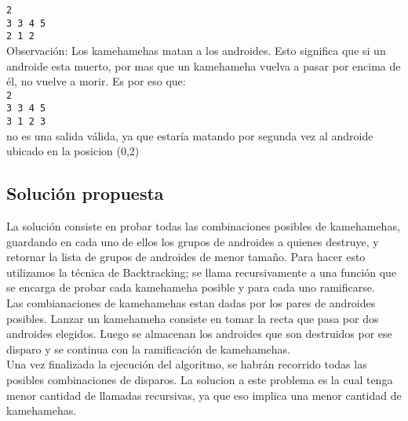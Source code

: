         \texttt{2} \\
        \texttt{3 3 4 5} \\
        \texttt{2 1 2} \\

        Observación: Los kamehamehas matan a los androides. Esto significa que si un androide esta muerto, por mas que un kamehameha vuelva a pasar por encima de él, no vuelve a morir. Es por eso que: \\

        \texttt{2} \\
        \texttt{3 3 4 5} \\
        \texttt{3 1 2 3} \\

        no es una salida válida, ya que estaría matando por segunda vez al androide ubicado en la posicion (0,2) \\
        

    \subsection{Solución propuesta}

    La solución consiste en probar todas las combinaciones posibles de kamehamehas, guardando en cada uno de ellos los grupos de androides a quienes destruye, y retornar la lista de grupos de androides de menor tamaño. Para hacer esto utilizamos la técnica de Backtracking; se llama recursivamente a una función que se encarga de probar cada kamehameha posible y para cada uno ramificarse. \\

    Las combianaciones de kamehamehas estan dadas por los pares de androides posibles. Lanzar un kamehameha consiste en tomar la recta que pasa por dos androides elegidos. Luego se almacenan los androides que son destruidos por ese disparo y se continua con la ramificación de kamehamehas. \\

    Una vez finalizada la ejecución del algoritmo, se habrán recorrido todas las posibles combinaciones de disparos. La solucion a este problema es la cual tenga menor cantidad de llamadas recursivas, ya que eso implica una menor cantidad de kamehamehas. \\

